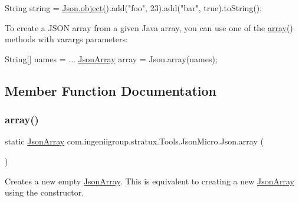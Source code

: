 \begin{DoxyPre}
String string = \hyperlink{classcom_1_1ingeniigroup_1_1stratux_1_1_tools_1_1_json_micro_1_1_json_af00c51eafc3d4e8f87ce07660acfbaae}{Json.object()}.add("foo", 23).add("bar", true).toString();
\end{DoxyPre}
 

To create a J\+S\+ON array from a given Java array, you can use one of the {\ttfamily \hyperlink{classcom_1_1ingeniigroup_1_1stratux_1_1_tools_1_1_json_micro_1_1_json_a5eb11ae96fc3a678d555537c65a6e323}{array()}} methods with varargs parameters\+: 


\begin{DoxyPre}
String[] names = ...
\hyperlink{classcom_1_1ingeniigroup_1_1stratux_1_1_tools_1_1_json_micro_1_1_json_array}{JsonArray} array = Json.array(names);
\end{DoxyPre}
 

\subsection{Member Function Documentation}
\mbox{\label{classcom_1_1ingeniigroup_1_1stratux_1_1_tools_1_1_json_micro_1_1_json_a5eb11ae96fc3a678d555537c65a6e323}} 
\subsubsection{\texorpdfstring{array()}{array()}\hspace{0.1cm}{\footnotesize\ttfamily [1/7]}}
{\footnotesize\ttfamily static \hyperlink{classcom_1_1ingeniigroup_1_1stratux_1_1_tools_1_1_json_micro_1_1_json_array}{Json\+Array} com.\+ingeniigroup.\+stratux.\+Tools.\+Json\+Micro.\+Json.\+array (\begin{DoxyParamCaption}{ }\end{DoxyParamCaption})\hspace{0.3cm}{\ttfamily [static]}}

Creates a new empty \hyperlink{classcom_1_1ingeniigroup_1_1stratux_1_1_tools_1_1_json_micro_1_1_json_array}{Json\+Array}. This is equivalent to creating a new \hyperlink{classcom_1_1ingeniigroup_1_1stratux_1_1_tools_1_1_json_micro_1_1_json_array}{Json\+Array} using the constructor.

